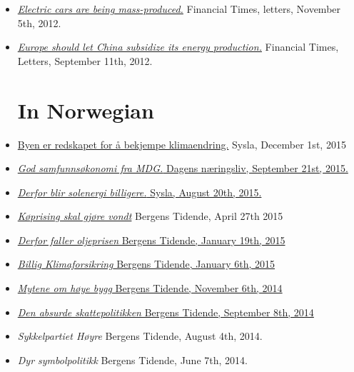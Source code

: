 \documentclass[margin]{res}
\begin{document}
\begin{resume}
\begin{itemize}
\item[] \href{http://www.ft.com/intl/cms/s/0/26168da6-238d-11e2-bb86-00144feabdc0.html#axzz2sclP2DP5}{\emph{Electric cars are being mass-produced.}}  Financial Times, letters, November 5th, 2012.

\item[] \href{http://www.ft.com/intl/cms/s/0/553d8cf6-fb56-11e1-87ae-00144feabdc0.html#axzz2sclP2DP5}{\emph{Europe should let China subsidize its energy production.}}  Financial Times, Letters, September 11th, 2012.


\normalsize{\section{In Norwegian}}
\item[] \href{http://www.syslagronn.no/2015/12/01/syslagronn/byen-er-redskapet-for-a-bekjempe-klimaendringer_67934/}{Byen er redskapet for å bekjempe klimaendring.} Sysla, December 1st, 2015
\item[] \href{http://www.dn.no/meninger/2015/09/20/2043/Politikk/god-samfunnskonomi-fra-mdg}{\emph{God samfunnsøkonomi fra MDG.} Dagens n\ae ringsliv, September 21st, 2015.}
\item[] \href{http://www.syslagronn.no/2015/08/20/syslagronn/derfor-blir-solenergi-billigere_51484/}{\emph{Derfor blir solenergi billigere.} Sysla, August 20th, 2015.}
\item[] \href{http://www.e-pages.dk/bergenstidende/1809/article/264899/28/2/render/?token=02cd272aa0579373983f0bf8c4cee611}{ \emph{K\o prising skal gjøre vondt}} Bergens Tidende, April 27th 2015
\item[] \href{http://www.bt.no/meninger/debatt/Derfor-faller-oljeprisen-3282375.html}{ \emph {Derfor faller oljeprisen} Bergens Tidende, January 19th, 2015}
\item[] \href{http://www.e-pages.dk/bergenstidende/1700/article/227941/31/4/render/?token=5207fb9bf5f917b5276532ef05164266}{ \emph {Billig Klimaforsikring} Bergens Tidende, January 6th, 2015}
\item[] \href{http://www.bt.no/meninger/debatt/Mytene-om-hoye-bygg-3234980.html}{ \emph {Mytene om h\o ye bygg} Bergens Tidende, November 6th, 2014}
\item[] \href{http://www.bt.no/meninger/debatt/Den-absurde-skattepolitikken-3191273.html}{\emph{Den absurde skattepolitikken} Bergens Tidende, September 8th, 2014}
\item[] \emph {Sykkelpartiet H\o yre}  Bergens Tidende, August 4th, 2014.
\item[] \emph {Dyr symbolpolitikk}  Bergens Tidende, June 7th, 2014.

\end{itemize}
\end{resume}
\end{document}

